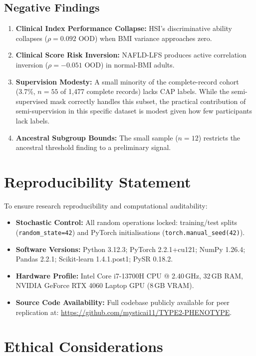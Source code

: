 \documentclass[12pt,a4paper,oneside]{report}
\begin{document}
\subsection{Negative Findings}

\begin{enumerate}[leftmargin=*]
    \item \textbf{Clinical Index Performance Collapse:} HSI's discriminative ability collapses ($\rho = 0.092$ OOD) when BMI variance approaches zero.
    \item \textbf{Clinical Score Risk Inversion:} NAFLD-LFS produces active correlation inversion ($\rho = -0.051$ OOD) in normal-BMI adults.
    \item \textbf{Supervision Modesty:} A small minority of the complete-record cohort (3.7\%, $n = 55$ of 1,477 complete records) lacks CAP labels. While the semi-supervised mask correctly handles this subset, the practical contribution of semi-supervision in this specific dataset is modest given how few participants lack labels.
    \item \textbf{Ancestral Subgroup Bounds:} The small sample ($n = 12$) restricts the ancestral threshold finding to a preliminary signal.
\end{enumerate}

\section{Reproducibility Statement}

To ensure research reproducibility and computational auditability:
\begin{itemize}[leftmargin=*]
    \item \textbf{Stochastic Control:} All random operations locked: training/test splits (\texttt{random\_state=42}) and PyTorch initialisations (\texttt{torch.manual\_seed(42)}).
    \item \textbf{Software Versions:} Python 3.12.3; PyTorch 2.2.1+cu121; NumPy 1.26.4; Pandas 2.2.1; Scikit-learn 1.4.1.post1; PySR 0.18.2.
    \item \textbf{Hardware Profile:} Intel Core i7-13700H CPU @ 2.40\,GHz, 32\,GB RAM, NVIDIA GeForce RTX 4060 Laptop GPU (8\,GB VRAM).
    \item \textbf{Source Code Availability:} Full codebase publicly available for peer replication at: \url{https://github.com/mysticai11/TYPE2-PHENOTYPE}.
\end{itemize}

\section{Ethical Considerations}
\end{document}
